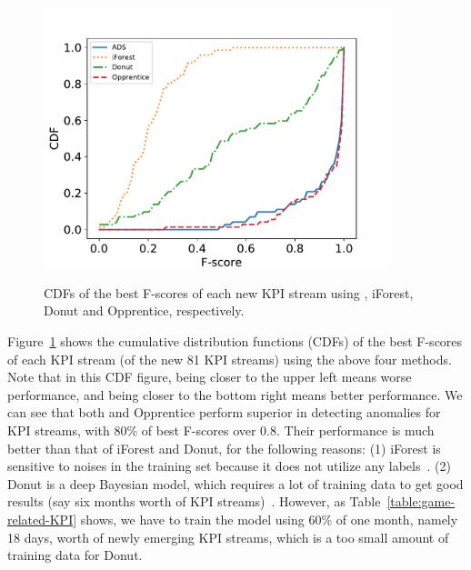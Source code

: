 \begin{figure}
      \begin{minipage}[h]{1.0\linewidth}
      \centering
      \includegraphics[width=0.9\textwidth]{fig/overview_fscore.pdf}\\
      \end{minipage}
      \caption{CDFs of the best F-scores of each new KPI stream using \name, iForest, Donut and Opprentice, respectively.
      }
      \label{fig:overview_fscore}
      \vspace{-6 mm}
\end{figure}

Figure~\ref{fig:overview_fscore} shows the cumulative distribution functions (CDFs) of the best F-scores of each KPI stream (of the new 81 KPI streams) using the above four methods.
Note that in this CDF figure, being closer to the upper left means worse performance, and being closer to the bottom right means better performance.
We can see that both \name{} and Opprentice perform superior in detecting anomalies for KPI streams, with 80\% of best F-scores over 0.8.
 Their performance is much better than that of iForest and Donut, for the following reasons: 
 (1) iForest is
 sensitive to noises in the training set because it does not utilize any labels~\cite{ding2013anomaly}. 
 (2) Donut is a deep Bayesian model, which requires a lot of training data to get good results (say six months worth of KPI streams)~\cite{xu2018unsupervised}.
However, as Table~\ref{table:game-related-KPI} shows, we have to train the model using 60\% of one month, namely 18 days, worth of newly emerging KPI streams, which is a too small amount of training data for Donut.

